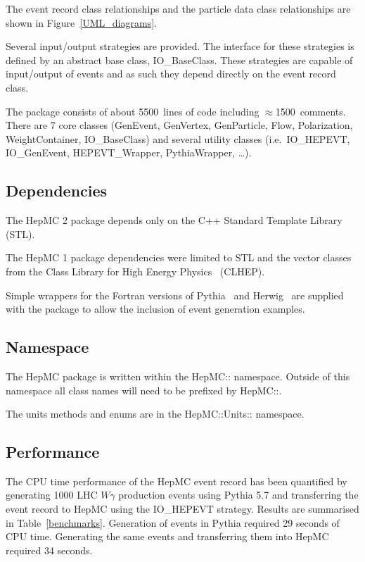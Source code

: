 \documentclass[11pt,letterpaper]{article}
\begin{document}
The event record class relationships and the particle
data class relationships are shown in Figure~\ref{UML_diagrams}.

Several input/output strategies are provided. The interface for these
strategies is defined by an abstract base class, IO\_BaseClass.  These
strategies are capable of input/output of events and as such they depend 
directly on the event record class.

The package consists of about 5500~lines of code including
$\approx$1500~comments. There are 7 core classes (GenEvent,
GenVertex, GenParticle, Flow, Polarization, WeightContainer,
IO\_BaseClass) and several utility classes (i.e.\ IO\_HEPEVT, IO\_GenEvent,
HEPEVT\_Wrapper, PythiaWrapper, \ldots).

\subsection{Dependencies}

The HepMC 2 package  depends only on the C++ Standard
Template Library~\cite{stl} (STL).

The HepMC 1 package dependencies were limited to STL 
and the vector classes from the
Class Library for High Energy Physics~\cite{clhep} (CLHEP).  

Simple wrappers for the Fortran versions of Pythia~\cite{Sjostrand:2001yb} 
and Herwig~\cite{herwig} are supplied with the
package to allow the inclusion of event generation examples.

\subsection{Namespace}

The HepMC package is written within the HepMC:: namespace. Outside of
this namespace all class names will need to be prefixed by HepMC::.

The units methods and enums are in the HepMC::Units:: namespace.

\subsection{Performance}

The CPU time performance of the HepMC event record has been quantified
by generating 1000 LHC $W\gamma$ production events using Pythia 5.7
and transferring the event record to HepMC using the IO\_HEPEVT
strategy. Results are summarised in Table~\ref{benchmarks}.
Generation of events in Pythia required 29 seconds of CPU time.
Generating the same events and transferring them into HepMC required
34 seconds.
\end{document}

